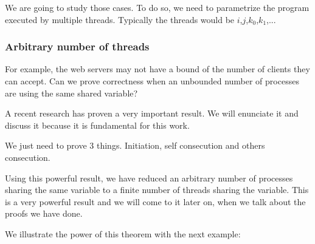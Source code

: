 We are going to study those cases. 
%
To do so, we need to parametrize the program executed by multiple threads. Typically the threads would be $i$,$j$,$k_0$,$k_1$,... 



\subsubsection{Arbitrary number of threads}


For example, the web servers may not have a bound of the number of clients they can accept.
%
Can we prove correctness when an unbounded number of processes are using the same shared variable?

A recent research  has proven a very important result. 
%
We will enunciate it and discuss it because it is fundamental for this work.


\begin{theorem}
We just need to prove 3 things. Initiation, self consecution and others consecution.
\end{theorem}
\label{thm:biggest}

Using this powerful result, we have reduced an arbitrary number of processes sharing the same variable to a finite number of threads sharing the variable. 
%
This is a very powerful result and we will come to it later on, when we talk about the proofs we have done. 

We illustrate the power of this theorem with the next example:

\begin{example}
\end{example}

